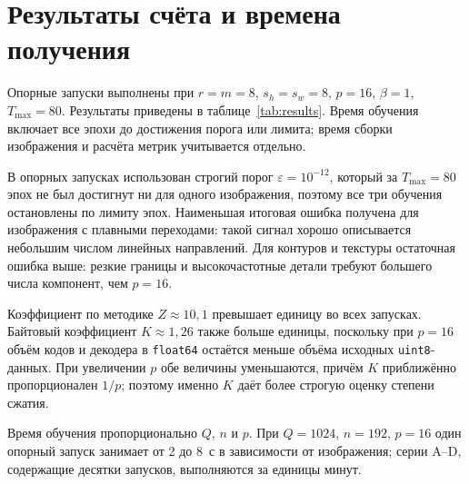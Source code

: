 \section{Результаты счёта и времена получения}
\label{sec:results}

Опорные запуски выполнены при $r=m=8$, $s_h=s_w=8$, $p=16$, $\beta=1$, $T_{\max}=80$. Результаты приведены в таблице~\ref{tab:results}. Время обучения включает все эпохи до достижения порога или лимита; время сборки изображения и расчёта метрик учитывается отдельно.



В опорных запусках использован строгий порог $\varepsilon=10^{-12}$, который за $T_{\max}=80$ эпох не был достигнут ни для одного изображения, поэтому все три обучения остановлены по лимиту эпох. Наименьшая итоговая ошибка получена для изображения с плавными переходами: такой сигнал хорошо описывается небольшим числом линейных направлений. Для контуров и текстуры остаточная ошибка выше: резкие границы и высокочастотные детали требуют большего числа компонент, чем $p=16$.

Коэффициент по методике $Z\approx10{,}1$ превышает единицу во всех запусках. Байтовый коэффициент $K\approx1{,}26$ также больше единицы, поскольку при $p=16$ объём кодов и декодера в \texttt{float64} остаётся меньше объёма исходных \texttt{uint8}-данных. При увеличении $p$ обе величины уменьшаются, причём $K$ приближённо пропорционален $1/p$; поэтому именно $K$ даёт более строгую оценку степени сжатия.

Время обучения пропорционально $Q$, $n$ и $p$. При $Q=1024$, $n=192$, $p=16$ один опорный запуск занимает от 2 до 8~с в зависимости от изображения; серии A--D, содержащие десятки запусков, выполняются за единицы минут.
